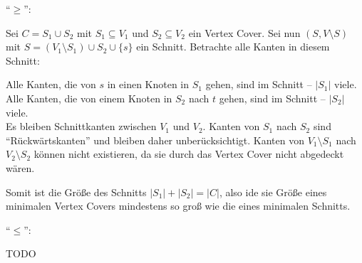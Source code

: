 \documentclass[a4paper]{article}
\begin{document}
"`$\geq$"':

Sei $C = S_1 \cup S_2$ mit $S_1 \subseteq V_1$ und $S_2 \subseteq V_2$ ein Vertex Cover.
Sei nun $( S, V \setminus S)$ mit $S = (V_1 \setminus S_1) \cup S_2 \cup
\{s\}$ ein Schnitt. Betrachte alle Kanten in diesem Schnitt:

Alle Kanten, die von $s$ in einen Knoten in $S_1$ gehen, sind im Schnitt -- $|S_1|$ viele.
\\
Alle Kanten, die von einem Knoten in $S_2$ nach $t$ gehen, sind im Schnitt
-- $|S_2|$ viele. \\
Es bleiben Schnittkanten zwischen $V_1$ und $V_2$. Kanten von $S_1$ nach
$S_2$ sind "`Rückwärtskanten"' und bleiben daher unberücksichtigt. Kanten
von $V_1 \setminus S_1$ nach $V_2 \setminus S_2$ können nicht existieren, da
sie durch das Vertex Cover nicht abgedeckt wären.

Somit ist die Größe des Schnitts $|S_1| + |S_2| = |C|$, also ide sie Größe
eines minimalen Vertex Covers mindestens so groß wie die eines minimalen
Schnitts.

"`$\leq$"':

TODO
\end{document}
